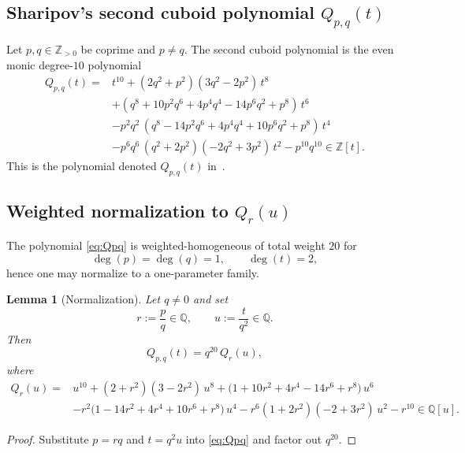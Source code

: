 \documentclass[12pt]{article}
\newtheorem{lemma}{Lemma}
\theoremstyle{remark}
\theoremstyle{definition}
\begin{document}
\subsection{Sharipov's second cuboid polynomial \texorpdfstring{$Q_{p,q}(t)$}{Qp,q(t)}}
Let $p,q\in\mathbb{Z}_{>0}$ be coprime and $p\neq q$.
The second cuboid polynomial is the even monic degree-$10$ polynomial
\begin{align}
Q_{p,q}(t)
={}&t^{10} + (2 q^{2} + p^{2})(3 q^{2} - 2 p^{2})\, t^{8} \nonumber\\
&+ (q^{8} + 10 p^{2} q^{6} + 4 p^{4} q^{4} - 14 p^{6} q^{2} + p^{8})\, t^{6} \nonumber\\
&- p^{2} q^{2}\,(q^{8} - 14 p^{2} q^{6} + 4 p^{4} q^{4} + 10 p^{6} q^{2} + p^{8})\, t^{4} \nonumber\\
&- p^{6} q^{6}\,(q^{2} + 2 p^{2})(-2 q^{2} + 3 p^{2})\, t^{2}
- p^{10} q^{10}\in\mathbb{Z}[t].\label{eq:Qpq}
\end{align}
This is the polynomial denoted $Q_{p,q}(t)$ in~\cite{Sharipov2011Cuboids,Sharipov2011Note}.

\subsection{Weighted normalization to \texorpdfstring{$Q_r(u)$}{Qr(u)}}
The polynomial \eqref{eq:Qpq} is weighted-homogeneous of total weight $20$ for
\[
\deg(p)=\deg(q)=1,\qquad \deg(t)=2,
\]
hence one may normalize to a one-parameter family.

\begin{lemma}[Normalization]\label{lem:normalize}
Let $q\neq 0$ and set
\[
r:=\frac{p}{q}\in\mathbb{Q},\qquad u:=\frac{t}{q^{2}}\in\mathbb{Q}.
\]
Then
\begin{equation}\label{eq:normalize}
Q_{p,q}(t)=q^{20}\,Q_r(u),
\end{equation}
where
\begin{equation}\label{eq:Qr}
\begin{aligned}
Q_r(u)
={}& u^{10} + (2+r^2)(3-2r^2)\,u^{8} + \bigl(1+10r^2+4r^4-14r^6+r^8\bigr)\,u^{6}\\
& - r^2\bigl(1-14r^2+4r^4+10r^6+r^8\bigr)\,u^{4}
 - r^6(1+2r^2)(-2+3r^2)\,u^{2}
 - r^{10}\in\mathbb{Q}[u].
\end{aligned}
\end{equation}
\end{lemma}

\begin{proof}
Substitute $p=rq$ and $t=q^2u$ into \eqref{eq:Qpq} and factor out $q^{20}$.
\end{proof}
\end{document}
